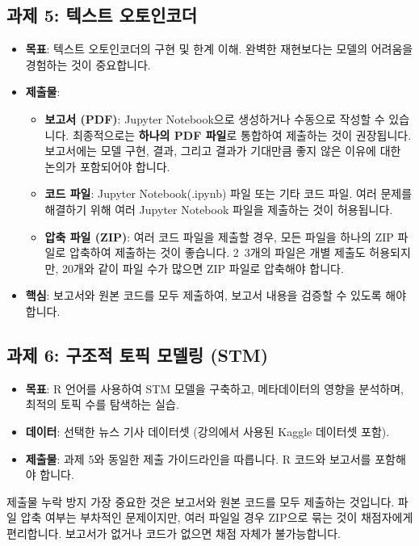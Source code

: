 \documentclass[11pt,a4paper]{article}
\begin{document}
\subsection*{과제 5: 텍스트 오토인코더}
\begin{itemize}
    \item \textbf{목표}: 텍스트 오토인코더의 구현 및 한계 이해. 완벽한 재현보다는 모델의 어려움을 경험하는 것이 중요합니다.
    \item \textbf{제출물}:
    \begin{itemize}
        \item \textbf{보고서 (PDF)}: Jupyter Notebook으로 생성하거나 수동으로 작성할 수 있습니다. 최종적으로는 \textbf{하나의 PDF 파일}로 통합하여 제출하는 것이 권장됩니다. 보고서에는 모델 구현, 결과, 그리고 결과가 기대만큼 좋지 않은 이유에 대한 논의가 포함되어야 합니다.
        \item \textbf{코드 파일}: Jupyter Notebook(.ipynb) 파일 또는 기타 코드 파일. 여러 문제를 해결하기 위해 여러 Jupyter Notebook 파일을 제출하는 것이 허용됩니다.
        \item \textbf{압축 파일 (ZIP)}: 여러 코드 파일을 제출할 경우, 모든 파일을 하나의 ZIP 파일로 압축하여 제출하는 것이 좋습니다. 2~3개의 파일은 개별 제출도 허용되지만, 20개와 같이 파일 수가 많으면 ZIP 파일로 압축해야 합니다.
    \end{itemize}
    \item \textbf{핵심}: 보고서와 원본 코드를 모두 제출하여, 보고서 내용을 검증할 수 있도록 해야 합니다.
\end{itemize}

\subsection*{과제 6: 구조적 토픽 모델링 (STM)}
\begin{itemize}
    \item \textbf{목표}: R 언어를 사용하여 STM 모델을 구축하고, 메타데이터의 영향을 분석하며, 최적의 토픽 수를 탐색하는 실습.
    \item \textbf{데이터}: 선택한 뉴스 기사 데이터셋 (강의에서 사용된 Kaggle 데이터셋 포함).
    \item \textbf{제출물}: 과제 5와 동일한 제출 가이드라인을 따릅니다. R 코드와 보고서를 포함해야 합니다.
\end{itemize}

\begin{cautionbox}{제출물 누락 방지}
가장 중요한 것은 보고서와 원본 코드를 모두 제출하는 것입니다. 파일 압축 여부는 부차적인 문제이지만, 여러 파일일 경우 ZIP으로 묶는 것이 채점자에게 편리합니다. 보고서가 없거나 코드가 없으면 채점 자체가 불가능합니다.
\end{cautionbox}
\end{document}
